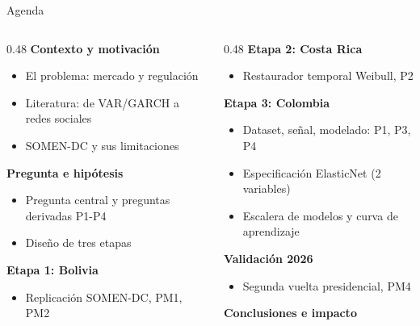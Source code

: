 \begin{frame}{Agenda}
  \begin{columns}[T]
    \begin{column}{0.48\textwidth}
      \textbf{\color{barBlue}Contexto y motivación}
      \begin{itemize}
        \item El problema: mercado y regulación
        \item Literatura: de VAR/GARCH a redes sociales
        \item SOMEN-DC y sus limitaciones
      \end{itemize}
      \vspace{0.4em}
      \textbf{\color{barBlue}Pregunta e hipótesis}
      \begin{itemize}
        \item Pregunta central y preguntas derivadas P1-P4
        \item Diseño de tres etapas
      \end{itemize}
      \vspace{0.4em}
      \textbf{\color{barBlue}Etapa 1: Bolivia}
      \begin{itemize}
        \item Replicación SOMEN-DC, PM1, PM2
      \end{itemize}
    \end{column}
    \begin{column}{0.48\textwidth}
      \textbf{\color{barBlue}Etapa 2: Costa Rica}
      \begin{itemize}
        \item Restaurador temporal Weibull, P2
      \end{itemize}
      \vspace{0.4em}
      \textbf{\color{barBlue}Etapa 3: Colombia}
      \begin{itemize}
        \item Dataset, señal, modelado: P1, P3, P4
        \item Especificación ElasticNet (2 variables)
        \item Escalera de modelos y curva de aprendizaje
      \end{itemize}
      \vspace{0.4em}
      \textbf{\color{barBlue}Validación 2026}
      \begin{itemize}
        \item Segunda vuelta presidencial, PM4
      \end{itemize}
      \vspace{0.4em}
      \textbf{\color{barBlue}Conclusiones e impacto}
    \end{column}
  \end{columns}
\end{frame}
